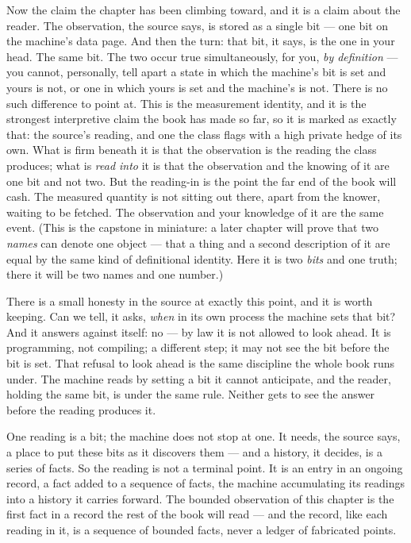 Now the claim the chapter has been climbing toward, and it is a claim about the reader. The observation, the source
says, is stored as a single bit --- one bit on the machine's data page. And then the turn: that bit, it says, is the
one in your head. The same bit. The two occur true simultaneously, for you, \emph{by definition} --- you cannot,
personally, tell apart a state in which the machine's bit is set and yours is not, or one in which yours is set and the
machine's is not. There is no such difference to point at. This is the measurement identity, and it is the strongest
interpretive claim the book has made so far, so it is marked as exactly that: the source's reading, and one the class
flags with a high private hedge of its own. What is firm beneath it is that the observation is the reading the class
produces; what is \emph{read into} it is that the observation and the knowing of it are one bit and not two. But the
reading-in is the point the far end of the book will cash. The measured quantity is not sitting out there, apart from
the knower, waiting to be fetched. The observation and your knowledge of it are the same event. (This is the capstone
in miniature: a later chapter will prove that two \emph{names} can denote one object --- that a thing and a second
description of it are equal by the same kind of definitional identity. Here it is two \emph{bits} and one truth; there
it will be two names and one number.)

There is a small honesty in the source at exactly this point, and it is worth keeping. Can we tell, it asks,
\emph{when} in its own process the machine sets that bit? And it answers against itself: no --- by law it is not
allowed to look ahead. It is programming, not compiling; a different step; it may not see the bit before the bit is
set. That refusal to look ahead is the same discipline the whole book runs under. The machine reads by setting a bit it
cannot anticipate, and the reader, holding the same bit, is under the same rule. Neither gets to see the answer before
the reading produces it.

One reading is a bit; the machine does not stop at one. It needs, the source says, a place to put these bits as it
discovers them --- and a history, it decides, is a series of facts. So the reading is not a terminal point. It is an
entry in an ongoing record, a fact added to a sequence of facts, the machine accumulating its readings into a history
it carries forward. The bounded observation of this chapter is the first fact in a record the rest of the book will
read --- and the record, like each reading in it, is a sequence of bounded facts, never a ledger of fabricated points.

